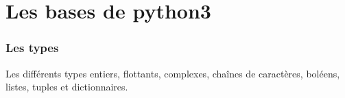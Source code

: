 \documentclass[10pt,dvipsnames,  dvips]{article}
\newcounter{Chapter}
\newcommand{\Chapter}[1]{\stepcounter{Chapter}\chead{\colorbox{black!15}{ \Large\textbf{\Roman{Chapter} #1}}  }}
\begin{document}
%
%
%
%
%
%
%
%
%
%
%
%
%
\section{Les bases de python3}

\subsubsection*{Les types}

Les différents types entiers, flottants, complexes, chaînes de caractères, boléens, listes, tuples et dictionnaires.


\end{document}
